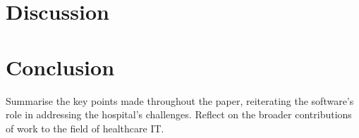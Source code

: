 \documentclass[11pt]{article}
\begin{document}
\section{Discussion}

\section{Conclusion}
Summarise the key points made throughout the paper, reiterating the software's role in addressing the hospital's challenges.
Reflect on the broader contributions of work to the field of healthcare IT.



\end{document}
